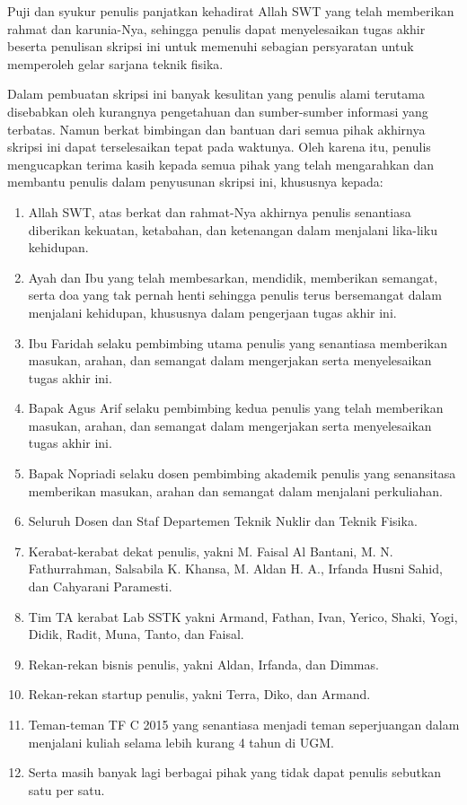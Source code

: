Puji dan syukur penulis panjatkan kehadirat Allah SWT yang telah memberikan rahmat dan karunia-Nya, sehingga penulis dapat menyelesaikan tugas akhir beserta penulisan skripsi ini untuk memenuhi sebagian persyaratan untuk memperoleh gelar sarjana teknik fisika.

Dalam pembuatan skripsi ini banyak kesulitan yang penulis alami terutama disebabkan oleh kurangnya pengetahuan dan sumber-sumber informasi yang terbatas. Namun berkat bimbingan dan bantuan dari semua pihak akhirnya skripsi ini dapat terselesaikan tepat pada waktunya. Oleh karena itu, penulis mengucapkan terima kasih kepada semua pihak yang telah mengarahkan dan membantu penulis dalam penyusunan skripsi ini, khususnya kepada:

\begin{enumerate}
	\item Allah SWT, atas berkat dan rahmat-Nya akhirnya penulis senantiasa diberikan kekuatan, ketabahan, dan ketenangan dalam menjalani lika-liku kehidupan.
	\item Ayah dan Ibu yang telah membesarkan, mendidik, memberikan semangat, serta doa yang tak pernah henti sehingga penulis terus bersemangat dalam menjalani kehidupan, khususnya dalam pengerjaan tugas akhir ini.
	\item Ibu Faridah selaku pembimbing utama penulis yang senantiasa memberikan masukan, arahan, dan semangat dalam mengerjakan serta menyelesaikan tugas akhir ini.
	\item Bapak Agus Arif selaku pembimbing kedua penulis yang telah memberikan masukan, arahan, dan semangat dalam mengerjakan serta menyelesaikan tugas akhir ini.
	\item Bapak Nopriadi selaku dosen pembimbing akademik penulis yang senansitasa memberikan masukan, arahan dan semangat dalam menjalani perkuliahan.
	\item Seluruh Dosen dan Staf Departemen Teknik Nuklir dan Teknik Fisika.
	\item Kerabat-kerabat dekat penulis, yakni M. Faisal Al Bantani, M. N. Fathurrahman, Salsabila K. Khansa, M. Aldan H. A., Irfanda Husni Sahid,  dan Cahyarani Paramesti.	
	\item Tim TA kerabat Lab SSTK yakni Armand, Fathan, Ivan, Yerico, Shaki, Yogi, Didik, Radit, Muna, Tanto, dan Faisal.
	\item Rekan-rekan bisnis penulis, yakni Aldan, Irfanda, dan Dimmas.
	\item Rekan-rekan startup penulis, yakni Terra, Diko, dan Armand.
	\item Teman-teman TF C 2015 yang senantiasa menjadi teman seperjuangan dalam menjalani kuliah selama lebih kurang 4 tahun di UGM.
	\item Serta masih banyak lagi berbagai pihak yang tidak dapat penulis sebutkan satu per satu.
\end{enumerate}

